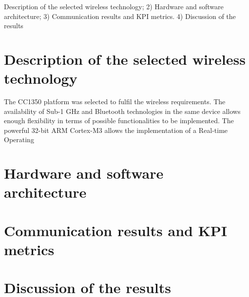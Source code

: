 \lipsum[4-4]

Description of the selected wireless technology; 2)
Hardware and software architecture; 3) Communication results and KPI metrics. 4) Discussion
of the results

\section{Description of the selected wireless technology}

The CC1350 platform was selected to fulfil the wireless requirements. The availability of Sub-1 GHz and Bluetooth technologies in the same device allows enough flexibility in terms of possible functionalities to be implemented. The powerful 32-bit ARM Cortex-M3 allows the implementation of a Real-time Operating 

\section{Hardware and software architecture}
\lipsum[4-4]

\section{Communication results and KPI metrics}
\lipsum[4-4]

\section{Discussion of the results}
\lipsum[4-4]